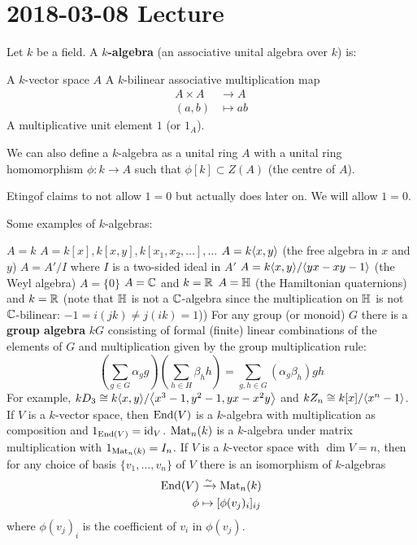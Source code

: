 \section{2018-03-08 Lecture}

\begin{defn}
	Let $k$ be a field.
	A \textbf{$k$-algebra} (an associative unital algebra over $k$) is:
	\begin{itm}
		\io A $k$-vector space $A$
		\io A $k$-bilinear associative multiplication map
			\begin{align*}
				A \times A &\to A \\
				(a,b) &\mapsto ab
			\end{align*}
		\io A multiplicative unit element $1$ (or $1_A$).
	\end{itm}
\end{defn}

\begin{rmk}
	We can also define a $k$-algebra as a unital ring $A$ with a unital ring homomorphism $\phi: k \to A$ such that $\phi[k] \subset Z(A)$ (the centre of $A$).
\end{rmk}

\begin{rmk}
	Etingof claims to not allow $1=0$ but actually does later on.
	We will allow $1=0$.
\end{rmk}

\begin{exam}
	Some examples of $k$-algebras:
	\begin{enum}
		\io $A=k$
		\io $A=k[x],k[x,y],k[x_1,x_2,\ldots],\ldots$
		\io $A=k{\left\langle x,y \right\rangle}$ (the free algebra in $x$ and $y$)
		\io $A=A'/I$ where $I$ is a two-sided ideal in $A'$
		\io $A=k{\left\langle x,y \right\rangle}/{\left\langle yx-xy-1 \right\rangle}$ (the Weyl algebra)
		\io $A=\{0\}$
		\io $A=\mathbb{C}$ and $k=\mathbb{R}$
		\io $A=\mathbb{H}$ (the Hamiltonian quaternions) and $k=\mathbb{R}$ (note that $\mathbb{H}$ is not a $\mathbb{C}$-algebra since the multiplication on $\mathbb{H}$ is not $\mathbb{C}$-bilinear: $-1=i(jk)\neq j(ik)=1$))
		\io For any group (or monoid) $G$ there is a \textbf{group algebra} $kG$ consisting of formal (finite) linear combinations of the elements of $G$ and multiplication given by the group multiplication rule:
		\[\left(\sum_{g\in G}\alpha_gg\right)\left(\sum_{h\in H}\beta_hh\right)=\sum_{g,h\in G}(\alpha_g\beta_h)gh\]
		For example, $kD_3\cong k{\left\langle x,y \right\rangle}/{\left\langle x^3-1,y^2-1,yx-x^2y \right\rangle}$ and $kZ_n\cong k[x]/{\left\langle x^n-1 \right\rangle}$.
		\io If $V$ is a $k$-vector space, then $\operatorname{End}(V)$ is a $k$-algebra with multiplication as composition and $1_{\operatorname{End}(V)}=\operatorname{id}_V$.
		\io $\operatorname{Mat}_n(k)$ is a $k$-algebra under matrix multiplication with $1_{\operatorname{Mat}_n(k)}=I_n$.
		If $V$ is a $k$-vector space with $\dim V=n$, then for any choice of basis $\{v_1,\ldots,v_n\}$ of $V$ there is an isomorphism of $k$-algebras
		\begin{align*}
			\operatorname{End}(V) &\xrightarrow{\sim} \operatorname{Mat}_n(k) \\
			\phi &\mapsto [\phi(v_j)_i]_{ij}
		\end{align*}
		where $\phi(v_j)_i$ is the coefficient of $v_i$ in $\phi(v_j)$.
	\end{enum}
\end{exam}

